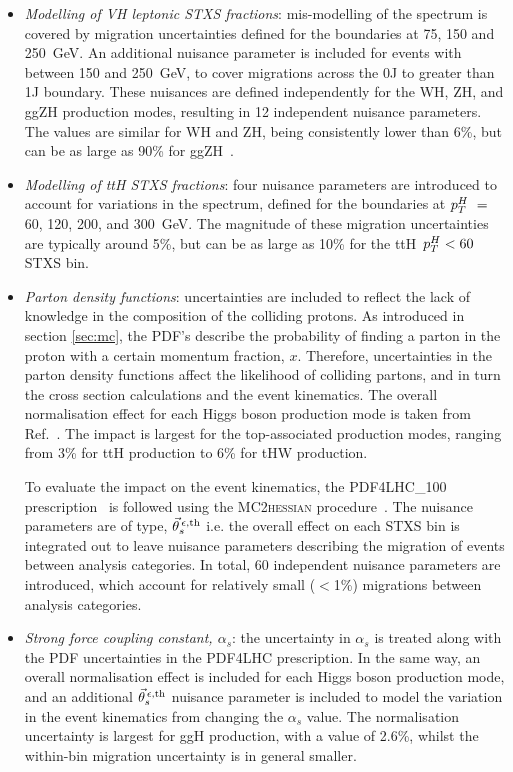 \begin{itemize}
    \item \textit{Modelling of VH leptonic STXS fractions}: mis-modelling of the \ptV spectrum is covered by migration uncertainties defined for the boundaries at 75, 150 and 250~GeV. An additional nuisance parameter is included for events with \ptV between 150 and 250~GeV, to cover migrations across the 0J to greater than 1J boundary. These nuisances are defined independently for the WH, ZH, and ggZH production modes, resulting in 12 independent nuisance parameters. The values are similar for WH and ZH, being consistently lower than 6\%, but can be as large as 90\% for ggZH~\cite{ATL-PHYS-PUB-2018-035}. 
    
    \item \textit{Modelling of ttH STXS fractions}: four nuisance parameters are introduced to account for variations in the \ptH spectrum, defined for the boundaries at $p_T^H~=~$60, 120, 200, and 300~GeV. The magnitude of these migration uncertainties are typically around 5\%, but can be as large as 10\% for the ttH~$p_T^H<60$ STXS bin.
    
    \item \textit{Parton density functions}: uncertainties are included to reflect the lack of knowledge in the composition of the colliding protons. As introduced in section \ref{sec:mc}, the PDF's describe the probability of finding a parton in the proton with a certain momentum fraction, $x$. Therefore, uncertainties in the parton density functions affect the likelihood of colliding partons, and in turn the cross section calculations and the event kinematics. The overall normalisation effect for each Higgs boson production mode is taken from Ref.~\cite{deFlorian:2016spz}. The impact is largest for the top-associated production modes, ranging from 3\% for ttH production to 6\% for tHW production.
    
    \noindent
    To evaluate the impact on the event kinematics, the PDF4LHC\_100 prescription~\cite{Ball:2014uwa,Butterworth:2015oua,Dulat:2015mca,Harland-Lang:2014zoa} is followed using the MC2\textsc{hessian} procedure~\cite{Carrazza:2015aoa,Gao:2013bia}. The nuisance parameters are of type, $\vec{\theta}^{\,\epsilon,{\rm{th}}}_{s}$ i.e. the overall effect on each STXS bin is integrated out to leave nuisance parameters describing the migration of events between analysis categories. In total, 60 independent nuisance parameters are introduced, which account for relatively small ($<$1\%) migrations between analysis categories.
    
    \item \textit{Strong force coupling constant, $\alpha_s$}: the uncertainty in $\alpha_s$ is treated along with the PDF uncertainties in the PDF4LHC prescription. In the same way, an overall normalisation effect is included for each Higgs boson production mode, and an additional $\vec{\theta}^{\,\epsilon,{\rm{th}}}_{s}$ nuisance parameter is included to model the variation in the event kinematics from changing the $\alpha_s$ value. The normalisation uncertainty is largest for ggH production, with a value of 2.6\%, whilst the within-bin migration uncertainty is in general smaller.
    

\end{itemize}

